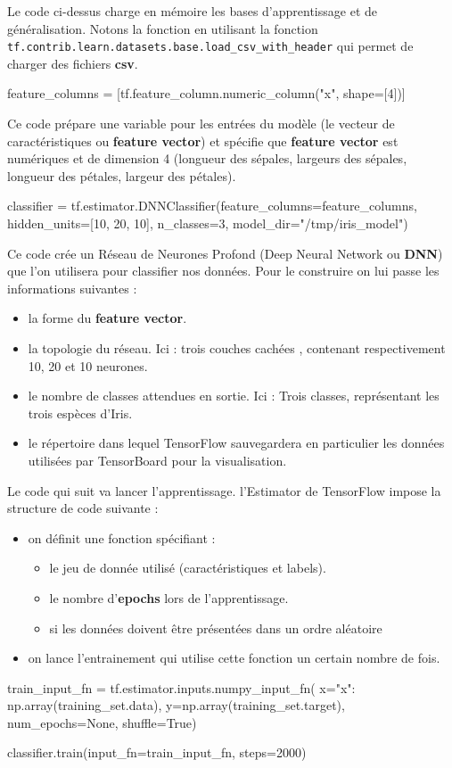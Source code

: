 \documentclass[a4paper,11pt]{book}
\begin{document}
Le code ci-dessus charge en mémoire les bases d'apprentissage et de généralisation. Notons la fonction en utilisant la fonction \verb+tf.contrib.learn.datasets.base.load_csv_with_header+ qui permet de charger des fichiers \textbf{csv}.
\begin{mypython}
feature_columns = [tf.feature_column.numeric_column("x", shape=[4])]
\end{mypython}
Ce code prépare une variable pour les entrées du modèle (le vecteur de caractéristiques ou \textbf{feature vector}) et spécifie que \textbf{feature vector} est numériques et de dimension 4 (longueur des sépales, largeurs des sépales, longueur des pétales, largeur des pétales).

\begin{mypython}
classifier = tf.estimator.DNNClassifier(feature_columns=feature_columns,
                                          hidden_units=[10, 20, 10],
                                          n_classes=3,
                                          model_dir="/tmp/iris_model")
\end{mypython}
Ce code crée un Réseau de Neurones Profond (Deep Neural Network ou \textbf{DNN}) que l'on utilisera pour classifier nos données. Pour le construire on lui passe les informations suivantes :
\begin{itemize}
\item la forme du \textbf{feature vector}.
\item la topologie du réseau. Ici : trois couches cachées , contenant respectivement 10, 20 et 10 neurones.
\item le nombre de classes attendues en sortie. Ici : Trois classes, représentant les trois espèces d'Iris.
\item le répertoire dans lequel TensorFlow sauvegardera en particulier les données utilisées par  TensorBoard pour la visualisation.
\end{itemize}

Le code qui suit va lancer l'apprentissage. l'Estimator de TensorFlow impose la structure de code suivante :
\begin{itemize}
	\item on définit une fonction spécifiant :
	\begin{itemize}	
		\item le jeu de donnée utilisé (caractéristiques et labels).
		\item le nombre d'\textbf{epochs} lors de l'apprentissage.
		\item si les données doivent être présentées dans un ordre aléatoire
	\end{itemize}
	\item on lance l'entrainement qui utilise cette fonction un certain nombre de fois.
\end{itemize}
\begin{mypython}
train_input_fn = tf.estimator.inputs.numpy_input_fn(
      x={"x": np.array(training_set.data)},
      y=np.array(training_set.target),
      num_epochs=None,
      shuffle=True)

classifier.train(input_fn=train_input_fn, steps=2000)
\end{mypython}
\end{document}
